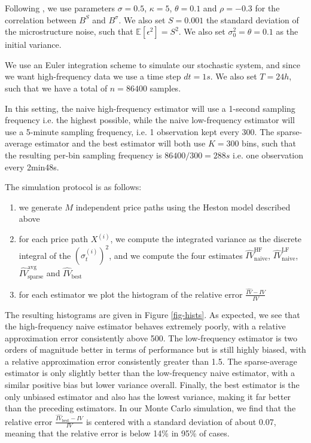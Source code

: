 \documentclass[a4paper,12pt,twoside]{article}
\begin{document}
Following \cite{liquidity}, we use parameters $\sigma=0.5$, $\kappa=5$, $\theta=0.1$ and $\rho=-0.3$ for the correlation between $B^S$ and $B^\sigma$. We also set $S=0.001$ the standard deviation of the microstructure noise, such that $\mathbb{E}[\epsilon^2]=S^2$. We also set $\sigma_0^2=\theta=0.1$ as the initial variance.

We use an Euler integration scheme to simulate our stochastic system, and since we want high-frequency data we use a time step $dt=1s$. We also set $T=24h$, such that we have a total of $n=86400$ samples.

In this setting, the naive high-frequency estimator will use a 1-second sampling frequency i.e. the highest possible, while the naive low-frequency estimator will use a 5-minute sampling frequency, i.e. 1 observation kept every 300. The sparse-average estimator and the best estimator will both use $K=300$ bins, such that the resulting per-bin sampling frequency is $86400/300=288s$ i.e. one observation every 2min48s.

The simulation protocol is as follows:
\begin{enumerate}
    \item we generate $M$ independent price paths using the Heston model described above
    \item for each price path $X^{(i)}$, we compute the integrated variance as the discrete integral of the $(\sigma_t^{(i)})^2$, and we compute the four estimates $\hat{IV}_\text{naive}^\text{HF}$, $\hat{IV}_\text{naive}^\text{LF}$, $\hat{IV}_\text{sparse}^\text{avg}$ and $\hat{IV}_\text{best}$
    \item for each estimator we plot the histogram of the relative error $\frac{\hat{IV}-IV}{IV}$
\end{enumerate}

The resulting histograms are given in Figure \ref{fig-hists}. As expected, we see that the high-frequency naive estimator behaves extremely poorly, with a relative approximation error consistently above 500. The low-frequency estimator is two orders of magnitude better in terms of performance but is still highly biased, with a relative approximation error consistently greater than 1.5. The sparse-average estimator is only slightly better than the low-frequency naive estimator, with a similar positive bias but lower variance overall. Finally, the best estimator is the only unbiased estimator and also has the lowest variance, making it far better than the preceding estimators. In our Monte Carlo simulation, we find that the relative error $\frac{\hat{IV}_\text{best}-IV}{IV}$ is centered with a standard deviation of about 0.07, meaning that the relative error is below 14\% in 95\% of cases.
\end{document}
